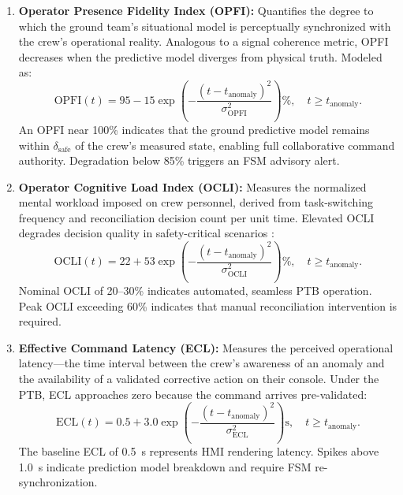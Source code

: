 \documentclass[ASNA,twocolumn]{USG}
\begin{document}
\begin{enumerate}
    \item \textbf{Operator Presence Fidelity Index (OPFI):} Quantifies the degree to which
    the ground team's situational model is perceptually synchronized with the crew's
    operational reality. Analogous to a signal coherence metric, OPFI decreases when
    the predictive model diverges from physical truth. Modeled as:
    \begin{equation}
        \text{OPFI}(t) = 95 - 15 \exp\!\left(-\frac{(t - t_\text{anomaly})^2}{\sigma_\text{OPFI}^2}\right)\%,
        \quad t \ge t_\text{anomaly}.
    \end{equation}
    An OPFI near 100\% indicates that the ground predictive model remains within
    \(\delta_\text{safe}\) of the crew's measured state, enabling full collaborative
    command authority. Degradation below 85\% triggers an FSM advisory alert.

    \item \textbf{Operator Cognitive Load Index (OCLI):} Measures the normalized mental
    workload imposed on crew personnel, derived from task-switching frequency and
    reconciliation decision count per unit time. Elevated OCLI degrades decision quality
    in safety-critical scenarios \cite{endsley1995}:
    \begin{equation}
        \text{OCLI}(t) = 22 + 53 \exp\!\left(-\frac{(t - t_\text{anomaly})^2}{\sigma_\text{OCLI}^2}\right)\%,
        \quad t \ge t_\text{anomaly}.
    \end{equation}
    Nominal OCLI of 20--30\% indicates automated, seamless PTB operation. Peak OCLI
    exceeding 60\% indicates that manual reconciliation intervention is required.

    \item \textbf{Effective Command Latency (ECL):} Measures the perceived operational
    latency---the time interval between the crew's awareness of an anomaly and the
    availability of a validated corrective action on their console. Under the PTB,
    ECL approaches zero because the command arrives pre-validated:
    \begin{equation}
        \text{ECL}(t) = 0.5 + 3.0 \exp\!\left(-\frac{(t - t_\text{anomaly})^2}{\sigma_\text{ECL}^2}\right)\text{s},
        \quad t \ge t_\text{anomaly}.
    \end{equation}
    The baseline ECL of 0.5~s represents HMI rendering latency. Spikes above 1.0~s
    indicate prediction model breakdown and require FSM re-synchronization.


\end{enumerate}
\end{document}
